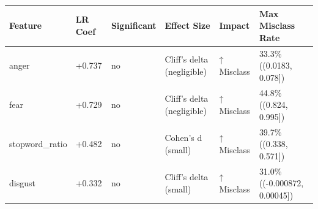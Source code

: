 \begin{tabular}{llllll}
\toprule
Feature & LR Coef & Significant & Effect Size & Impact & Max Misclass Rate \\
\midrule
anger & +0.737 & no & Cliff's delta (negligible) & ↑ Misclass & 33.3\% ((0.0183, 0.078]) \\
fear & +0.729 & no & Cliff's delta (negligible) & ↑ Misclass & 44.8\% ((0.824, 0.995]) \\
stopword\_ratio & +0.482 & no & Cohen's d (small) & ↑ Misclass & 39.7\% ((0.338, 0.571]) \\
disgust & +0.332 & no & Cliff's delta (small) & ↑ Misclass & 31.0\% ((-0.000872, 0.00045]) \\
\bottomrule
\end{tabular}

